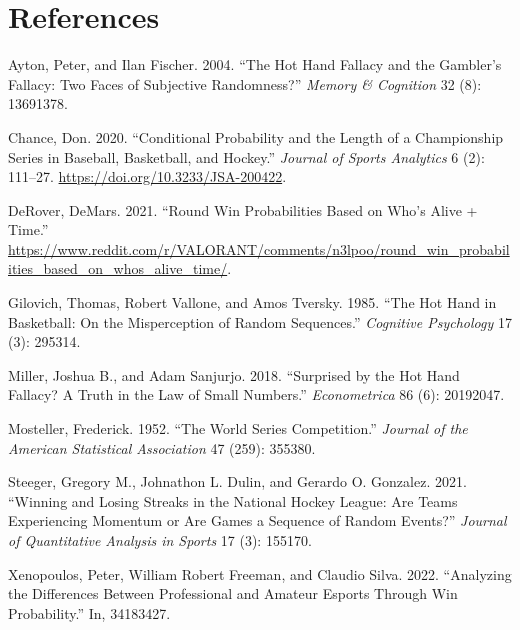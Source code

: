 \documentclass[
]{article}
\newlength{\cslhangindent}
\newlength{\cslentryspacingunit} %
\newenvironment{CSLReferences}[2] %
 {%
  \setlength{\parindent}{0pt}
  \ifodd #1
  \let\oldpar\par
  \def\par{\hangindent=\cslhangindent\oldpar}
  \fi
  \setlength{\parskip}{#2\cslentryspacingunit}
 }%
 {}
\begin{document}
\hypertarget{references}{%
\section*{References}\label{references}}

\hypertarget{refs}{}
\begin{CSLReferences}{1}{0}
\leavevmode{}%
Ayton, Peter, and Ilan Fischer. 2004. {``The Hot Hand Fallacy and the
Gambler{'}s Fallacy: Two Faces of Subjective Randomness?''} \emph{Memory
\& Cognition} 32 (8): 13691378.

\leavevmode{}%
Chance, Don. 2020. {``Conditional Probability and the Length of a
Championship Series in Baseball, Basketball, and Hockey.''}
\emph{Journal of Sports Analytics} 6 (2): 111--27.
\url{https://doi.org/10.3233/JSA-200422}.

\leavevmode{}%
DeRover, DeMars. 2021. {``Round Win Probabilities Based on Who's Alive +
Time.''}
\url{https://www.reddit.com/r/VALORANT/comments/n3lpoo/round_win_probabilities_based_on_whos_alive_time/}.

\leavevmode{}%
Gilovich, Thomas, Robert Vallone, and Amos Tversky. 1985. {``The Hot
Hand in Basketball: On the Misperception of Random Sequences.''}
\emph{Cognitive Psychology} 17 (3): 295314.

\leavevmode{}%
Miller, Joshua B., and Adam Sanjurjo. 2018. {``Surprised by the Hot Hand
Fallacy? A Truth in the Law of Small Numbers.''} \emph{Econometrica} 86
(6): 20192047.

\leavevmode{}%
Mosteller, Frederick. 1952. {``The World Series Competition.''}
\emph{Journal of the American Statistical Association} 47 (259): 355380.

\leavevmode{}%
Steeger, Gregory M., Johnathon L. Dulin, and Gerardo O. Gonzalez. 2021.
{``Winning and Losing Streaks in the National Hockey League: Are Teams
Experiencing Momentum or Are Games a Sequence of Random Events?''}
\emph{Journal of Quantitative Analysis in Sports} 17 (3): 155170.

\leavevmode{}%
Xenopoulos, Peter, William Robert Freeman, and Claudio Silva. 2022.
{``Analyzing the Differences Between Professional and Amateur Esports
Through Win Probability.''} In, 34183427.

\end{CSLReferences}
\end{document}
